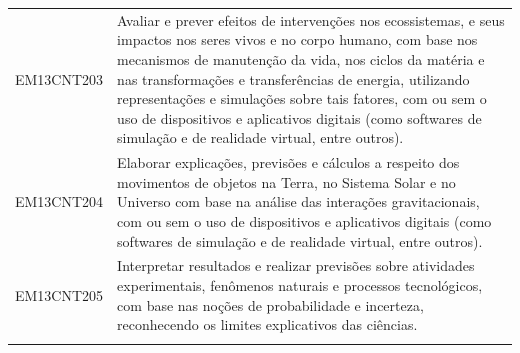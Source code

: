 \documentclass[12pt]{extarticle}
\begin{document}
\begin{longtable}{ll}
EM13CNT203 & Avaliar e prever efeitos de intervenções nos ecossistemas, e seus impactos nos seres vivos e no corpo humano, com base nos mecanismos de manutenção da vida, nos ciclos da matéria e nas transformações e transferências de energia, utilizando representações e simulações sobre tais fatores, com ou sem o uso de dispositivos e aplicativos digitais (como softwares de simulação e de realidade virtual, entre outros).                                                                                                                                                                                                                                                                                                                                                                                           \\
\rowcolor[HTML]{FFF} 
EM13CNT204 & Elaborar explicações, previsões e cálculos a respeito dos movimentos de objetos na Terra, no Sistema Solar e no Universo com base na análise das interações gravitacionais, com ou sem o uso de dispositivos e aplicativos digitais (como softwares de simulação e de realidade virtual, entre outros).                                                                                                                                                                                                                                                                                                                                                                                                                                                                                                               \\
\rowcolor[HTML]{E0F7FA} 
EM13CNT205 & Interpretar resultados e realizar previsões sobre atividades experimentais, fenômenos naturais e processos tecnológicos, com base nas noções de probabilidade e incerteza, reconhecendo os limites explicativos das ciências.                                                                                                                                                                                                                                                                                                                                                                                                                                                                                                                                                                                         \\
\rowcolor[HTML]{FFF} 

\end{longtable}
\end{document}
